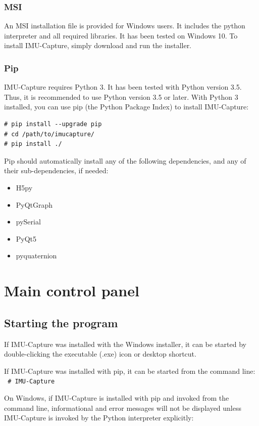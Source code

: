 \documentclass[11pt,letterpaper,article,oneside]{memoir}
\newcommand{\name}{IMU-Capture}
\begin{document}
\subsection{MSI}

An MSI installation file is provided for Windows users. It includes the
python interpreter and all required libraries. It has been tested on Windows 10.
To install \name{}, simply download and run the installer.

\subsection{Pip}

\name{} requires Python 3. It has been tested with Python version 3.5. Thus, it
is recommended to use Python version 3.5 or later.  With Python 3 installed, you
can use pip (the Python Package Index) to install \name{}:

\begin{verbatim}
# pip install --upgrade pip
# cd /path/to/imucapture/
# pip install ./
\end{verbatim}


Pip should automatically install any of the following dependencies, and any of their sub-dependencies, if needed:
\begin{itemize}
\item H5py
\item PyQtGraph
\item pySerial
\item PyQt5
\item pyquaternion
\end{itemize}


\chapter{Main control panel}

\section{Starting the program}

If \name{} was installed with the Windows installer, it can be started by double-clicking the
executable (.exe) icon or desktop shortcut.

If \name{} was installed with pip, it can be started from the command line:\\

\texttt{
\# \name{}
}

On Windows, if \name{} is installed with pip and invoked from the command line,
informational and error messages will not be displayed unless \name{} is invoked
by the Python interpreter explicitly:
\end{document}
